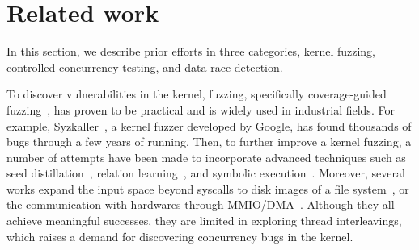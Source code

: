 \section{Related work}
\label{s:relwk}

%
In this section, we describe prior efforts in three categories, kernel
fuzzing, controlled concurrency testing, and data race detection.


%
To discover vulnerabilities in the kernel, fuzzing, specifically
coverage-guided fuzzing~\cite{syzkaller, moonshine, healer, hfl, imf,
  janus, hydra, trinity, kafl, periscope, syzvegas, ksg}, has proven
to be practical and is widely used in industrial fields.
%
For example, Syzkaller~\cite{syzkaller}, a kernel fuzzer developed by
Google, has found thousands of bugs through a few years of running.
%
%
Then, to further improve a kernel fuzzing,
%
a number of attempts have been made to incorporate
advanced techniques such as seed distillation~\cite{moonshine},
relation learning~\cite{healer}, and symbolic execution~\cite{hfl}.
%
Moreover, several works expand the input space beyond syscalls to disk
images of a file system~\cite{janus, hydra}, or the communication with
hardwares through MMIO/DMA~\cite{periscope}.
%
Although they all achieve meaningful successes, they are limited in
exploring thread interleavings, which raises a demand for discovering
concurrency bugs in the kernel.







